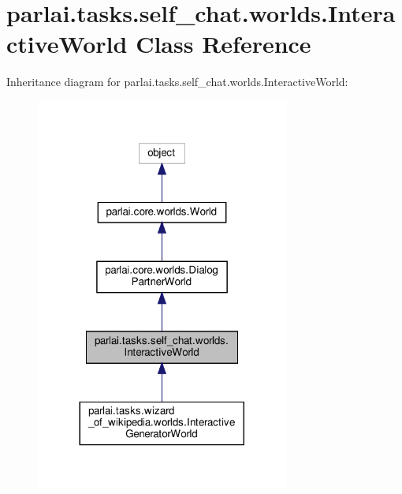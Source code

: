 \hypertarget{classparlai_1_1tasks_1_1self__chat_1_1worlds_1_1InteractiveWorld}{}\section{parlai.\+tasks.\+self\+\_\+chat.\+worlds.\+Interactive\+World Class Reference}
\label{classparlai_1_1tasks_1_1self__chat_1_1worlds_1_1InteractiveWorld}


Inheritance diagram for parlai.\+tasks.\+self\+\_\+chat.\+worlds.\+Interactive\+World\+:
\nopagebreak
\begin{figure}[H]
\begin{center}
\leavevmode
\includegraphics[width=236pt]{dc/d50/classparlai_1_1tasks_1_1self__chat_1_1worlds_1_1InteractiveWorld__inherit__graph}
\end{center}
\end{figure}


